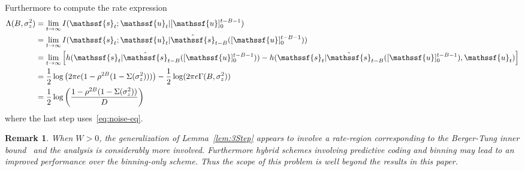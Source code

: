 \documentclass[journal, twocolumn, 10pt]{IEEEtran}
\newtheorem{remark}{Remark}
\newcommand{\rvs}{{\mathssf{s}}}    %
\newcommand{\rvu}{{\mathssf{u}}}    %
\begin{document}
{Furthermore to compute the rate expression 
\begin{align}
\Lambda(B, \sigma^2_{z}) &= \lim_{t\to \infty}  I(\rvs_{t} ; \rvu_{t} | [\rvu]_{0}^{t-B-1})\\
&= \lim_{t\to \infty}  I(\rvs_{t} ; \rvu_{t} | \hat{\rvs}_{t-B}([\rvu]_{0}^{t-B-1}))\\
&= \lim_{t\to \infty}  \left[h(\rvs_{t} | \hat{\rvs}_{t-B}([\rvu]_{0}^{t-B-1})) - h(\rvs_{t} | \hat{\rvs}_{t-B}([\rvu]_{0}^{t-B-1}), \rvu_{t}) \right]\\
& = \frac{1}{2} \log\left(2\pi e (1-{\rho ^{2B}}(1 - \Sigma(\sigma^2_{z})))\right) - \frac{1}{2} \log(2\pi e \Gamma(B,\sigma^2_{z})) \notag\\
& =\frac{1}{2} \log\left(\frac{1-\rho ^{2B}(1 - \Sigma(\sigma^2_{z}))}{D} \right)\label{Lam}
\end{align}  where the last step uses~\eqref{eq:noise-eq}. 
\fi





\begin{remark}
\label{rem:GenW}
When $W>0$,  the generalization of Lemma~\ref{lem:3Step} appears to involve a rate-region corresponding to the Berger-Tung inner bound~\cite{tung:78} and the analysis is considerably more involved. Furthermore hybrid schemes involving predictive coding and binning  may lead to an improved performance over the binning-only scheme. Thus the scope of this problem is well beyond the results in this paper.
\end{remark}


}
\end{document}
